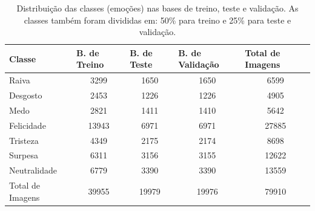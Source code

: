 \begin{table}[]
\centering
\caption{Distribuição das classes (emoções) nas bases de treino, teste e validação. As classes também foram divididas em: 50\% para treino e 25\% para teste e validação.}
\label{table:distclasse}
\begin{tabular}{lcccc}
\hline
\textbf{Classe}  & \multicolumn{1}{l}{\textbf{B. de Treino}} & \multicolumn{1}{l}{\textbf{B. de Teste}} & \multicolumn{1}{l}{\textbf{B. de Validação}} & \multicolumn{1}{l}{\textbf{Total de Imagens}} \\ \hline
Raiva            & 3299                                        & 1650                                       & 1650                                           & 6599                                          \\
Desgosto         & 2453                                        & 1226                                       & 1226                                           & 4905                                          \\
Medo             & 2821                                        & 1411                                       & 1410                                           & 5642                                          \\
Felicidade       & 13943                                       & 6971                                       & 6971                                           & 27885                                         \\
Tristeza         & 4349                                        & 2175                                       & 2174                                           & 8698                                          \\
Surpesa          & 6311                                        & 3156                                       & 3155                                           & 12622                                         \\
Neutralidade     & 6779                                        & 3390                                       & 3390                                           & 13559                                         \\
Total de Imagens & 39955                                       & 19979                                      & 19976                                          & 79910                                         \\ \hline
\end{tabular}
\end{table}


